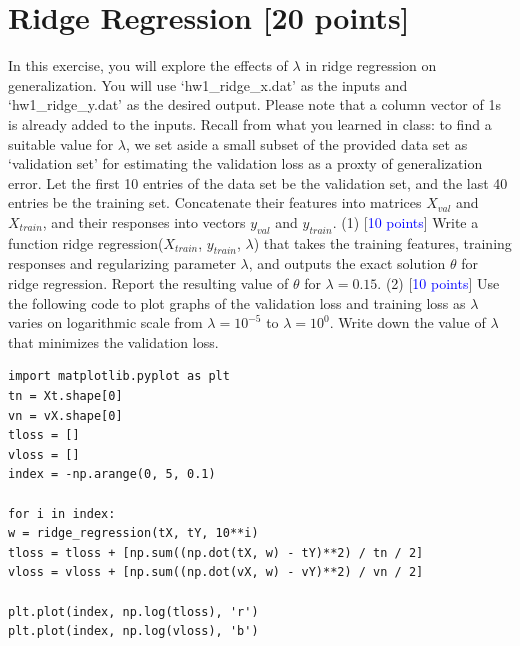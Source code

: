 \documentclass[11pt]{article}
\begin{document}
\section{Ridge Regression [20 points]}
In this exercise, you will explore the effects of $\lambda$ in ridge regression on generalization. You will use `hw1\_ridge\_x.dat' as the inputs and `hw1\_ridge\_y.dat' as the desired output. Please note that a column vector of 1s is already added to the inputs. Recall from what you learned in class: to find a suitable value for $\lambda$, we set aside a small subset of the provided data set as `validation set' for estimating the validation loss as a proxty of generalization error. Let the first 10 entries of the data set be the validation set, and the last 40 entries be the training set. Concatenate their features into matrices $X_{val}$ and $X_{train}$, and their responses into vectors $y_{val}$ and $y_{train}$.
\newline
\noindent (1) [\textcolor{blue}{10 points}] Write a function ridge regression($X_{train}$, $y_{train}$, $\lambda$) that takes the training features, training responses and regularizing parameter $\lambda$, and outputs the exact solution $\theta$ for ridge regression. Report the resulting value of $\theta$ for $\lambda = 0.15$.
\newline
\noindent (2) [\textcolor{blue}{10 points}] Use the following code to plot graphs of the validation loss and training loss as $\lambda$ varies on logarithmic scale from $\lambda = 10^{-5}$ to $\lambda= 10^0$. Write down the value of $\lambda$ that minimizes the validation loss.

\begin{lstlisting}
import matplotlib.pyplot as plt
tn = Xt.shape[0]
vn = vX.shape[0]
tloss = []
vloss = []
index = -np.arange(0, 5, 0.1)

for i in index:
w = ridge_regression(tX, tY, 10**i)
tloss = tloss + [np.sum((np.dot(tX, w) - tY)**2) / tn / 2]
vloss = vloss + [np.sum((np.dot(vX, w) - vY)**2) / vn / 2]

plt.plot(index, np.log(tloss), 'r')
plt.plot(index, np.log(vloss), 'b')
\end{lstlisting}
\end{document}
